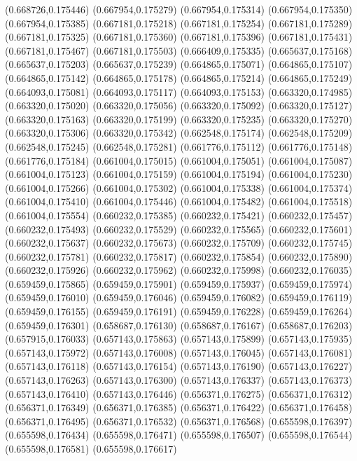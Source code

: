(0.668726,0.175446)
(0.667954,0.175279)
(0.667954,0.175314)
(0.667954,0.175350)
(0.667954,0.175385)
(0.667181,0.175218)
(0.667181,0.175254)
(0.667181,0.175289)
(0.667181,0.175325)
(0.667181,0.175360)
(0.667181,0.175396)
(0.667181,0.175431)
(0.667181,0.175467)
(0.667181,0.175503)
(0.666409,0.175335)
(0.665637,0.175168)
(0.665637,0.175203)
(0.665637,0.175239)
(0.664865,0.175071)
(0.664865,0.175107)
(0.664865,0.175142)
(0.664865,0.175178)
(0.664865,0.175214)
(0.664865,0.175249)
(0.664093,0.175081)
(0.664093,0.175117)
(0.664093,0.175153)
(0.663320,0.174985)
(0.663320,0.175020)
(0.663320,0.175056)
(0.663320,0.175092)
(0.663320,0.175127)
(0.663320,0.175163)
(0.663320,0.175199)
(0.663320,0.175235)
(0.663320,0.175270)
(0.663320,0.175306)
(0.663320,0.175342)
(0.662548,0.175174)
(0.662548,0.175209)
(0.662548,0.175245)
(0.662548,0.175281)
(0.661776,0.175112)
(0.661776,0.175148)
(0.661776,0.175184)
(0.661004,0.175015)
(0.661004,0.175051)
(0.661004,0.175087)
(0.661004,0.175123)
(0.661004,0.175159)
(0.661004,0.175194)
(0.661004,0.175230)
(0.661004,0.175266)
(0.661004,0.175302)
(0.661004,0.175338)
(0.661004,0.175374)
(0.661004,0.175410)
(0.661004,0.175446)
(0.661004,0.175482)
(0.661004,0.175518)
(0.661004,0.175554)
(0.660232,0.175385)
(0.660232,0.175421)
(0.660232,0.175457)
(0.660232,0.175493)
(0.660232,0.175529)
(0.660232,0.175565)
(0.660232,0.175601)
(0.660232,0.175637)
(0.660232,0.175673)
(0.660232,0.175709)
(0.660232,0.175745)
(0.660232,0.175781)
(0.660232,0.175817)
(0.660232,0.175854)
(0.660232,0.175890)
(0.660232,0.175926)
(0.660232,0.175962)
(0.660232,0.175998)
(0.660232,0.176035)
(0.659459,0.175865)
(0.659459,0.175901)
(0.659459,0.175937)
(0.659459,0.175974)
(0.659459,0.176010)
(0.659459,0.176046)
(0.659459,0.176082)
(0.659459,0.176119)
(0.659459,0.176155)
(0.659459,0.176191)
(0.659459,0.176228)
(0.659459,0.176264)
(0.659459,0.176301)
(0.658687,0.176130)
(0.658687,0.176167)
(0.658687,0.176203)
(0.657915,0.176033)
(0.657143,0.175863)
(0.657143,0.175899)
(0.657143,0.175935)
(0.657143,0.175972)
(0.657143,0.176008)
(0.657143,0.176045)
(0.657143,0.176081)
(0.657143,0.176118)
(0.657143,0.176154)
(0.657143,0.176190)
(0.657143,0.176227)
(0.657143,0.176263)
(0.657143,0.176300)
(0.657143,0.176337)
(0.657143,0.176373)
(0.657143,0.176410)
(0.657143,0.176446)
(0.656371,0.176275)
(0.656371,0.176312)
(0.656371,0.176349)
(0.656371,0.176385)
(0.656371,0.176422)
(0.656371,0.176458)
(0.656371,0.176495)
(0.656371,0.176532)
(0.656371,0.176568)
(0.655598,0.176397)
(0.655598,0.176434)
(0.655598,0.176471)
(0.655598,0.176507)
(0.655598,0.176544)
(0.655598,0.176581)
(0.655598,0.176617)
